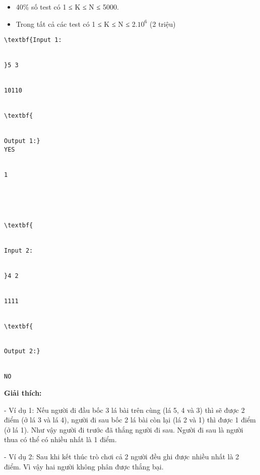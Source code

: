 \begin{itemize}
	\item     40\% số test có 1 ≤ K ≤ N ≤ 5000.   
	\item     Trong tất cả các test có 1 ≤ K ≤ N ≤ 2.$10^{6}$    (2 triệu)   
\end{itemize}
\begin{itemize}
\end{itemize}
\begin{verbatim}
\textbf{Input 1:


}5 3


10110


\textbf{


Output 1:}
YES


1





\textbf{


Input 2:


}4 2


1111


\textbf{


Output 2:}


NO\end{verbatim}

\textbf{    Giải thích:   }

   - Ví dụ 1: Nếu người đi đầu bốc 3 lá bài trên cùng (lá 5, 4 và 3) thì sẽ được 2 điểm (ở lá 3 và lá 4), người đi sau bốc 2 lá bài còn lại (lá 2 và 1) thì được 1 điểm (ở lá 1). Như vậy người đi trước đã thắng người đi sau. Người đi sau là người thua có thể có nhiều nhất là 1 điểm.  

   - Ví dụ 2: Sau khi kết thúc trò chơi cả 2 người đều ghi được nhiều nhất là 2 điểm. Vì vậy hai người không phân được thắng bại.